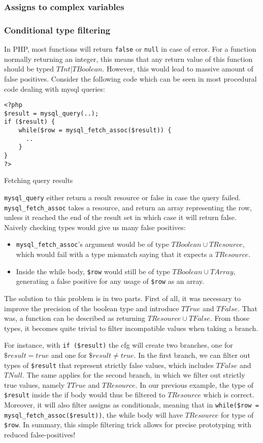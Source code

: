 \documentclass[a4paper]{article}
\begin{document}
\subsubsection{Assigns to complex variables}

\subsubsection{Conditional type filtering}
In PHP, most functions will return \verb/false/  or \verb/null/ in case of error.
For a function normally returning an integer, this means that any return value of this
function should be typed $TInt|TBoolean$. However, this would lead to massive amount of
false positives. Consider the following code which can be seen in most procedural code
dealing with mysql queries:

\begin{listing}
  \begin{verbatim}
<?php
$result = mysql_query(..);
if ($result) {
    while($row = mysql_fetch_assoc($result)) {
      ..
    }
}
?>
  \end{verbatim}
  \caption{Fetching query results}
\end{listing}

\verb/mysql_query/ either return a result resource or false in case the query
failed. \verb/mysql_fetch_assoc/ takes a resource, and return an array
representing the row, unless it reached the end of the result set in which case
it will return false. Naively checking types would give us many false positives:
\begin{itemize}
  \item \verb/mysql_fetch_assoc/'s argument would be of type
    $TBoolean \cup TResource$, which would fail with a type mismatch saying that it
    expects a $TResource$.
  \item Inside the while body, \verb/$row/ would still be of type
    $TBoolean \cup TArray$, generating a false positive for any usage of \verb/$row/
    as an array.
\end{itemize}

The solution to this problem is in two parts. First of all, it was necessary to
improve the precision of the boolean type and introduce $TTrue$ and $TFalse$. That
was, a function can be described as returning $TResource \cup TFalse$. From those
types, it becomes quite trivial to filter incompatible values when taking a branch.

For instance, with \verb/if ($result)/ the cfg will create two branches, one
for $\$result = true$ and one for $\$result \neq true$. In the first branch, we
can filter out types of \verb/$result/ that represent strictly false values,
which includes $TFalse$ and $TNull$. The same applies for the second branch,
in which we filter out strictly true values, namely $TTrue$ and $TResource$. In
our previous example, the type of \verb/$result/ inside the if body would thus
be filtered to $TResource$ which is correct. Moreover, it will also filter
assigns as conditionals, meaning that in 
\verb/while($row = mysql_fetch_assoc($result))/, the while body will have
$TResource$ for type of \verb/$row/. In summary, this simple filtering trick allows
for precise prototyping with reduced false-positives!
\end{document}
